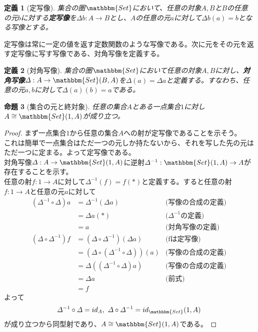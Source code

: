 \documentclass[uplatex,dvipdfmx]{jsarticle}
\newcommand{\cat}[1]{\mathbbm{#1}}
\newcommand{\arrow}{\rightarrow}
\newcommand{\mor}[3]{#1:#2\arrow #3}
\newcommand{\arset}[3]{\cat{#1}(#2,#3)}
\newtheorem{proof}{証明}[section]
\newtheorem{prop}[proof]{命題}
\newtheorem{define}[proof]{定義}
\numberwithin{proof}{subsection}
\begin{document}
  \begin{define}[定写像]
    集合の圏$\cat{Set}$において、任意の対象$A,B$と$B$の任意の元$b$に対する\textbf{定写像}を$\mor{\varDelta b}{A}{B}$とし、$A$の任意の元$a$に対して$\varDelta b(a)=b$となる写像とする。
  \end{define}
  定写像は常に一定の値を返す定数関数のような写像である。次に元をその元を返す定写像に写す写像である、対角写像を定義する。
  \begin{define}[対角写像]
    集合の圏$\cat{Set}$において任意の対象$A,B$に対し、\textbf{対角写像}$\mor{\varDelta}{A}{\arset{Set}{B}{A}}$を$\varDelta(a)=\varDelta a$と定義する。すなわち、任意の元$a,b$に対して$\varDelta(a)(b)=a$である。
  \end{define}
	\begin{prop}[集合の元と終対象]
		任意の集合$A$とある一点集合$1$に対し$A\cong\arset{Set}{1}{A}$が成り立つ。
	\end{prop}
	\begin{proof}
    まず一点集合$1$から任意の集合$A$への射が定写像であることを示そう。\\
    これは簡単で一点集合はただ一つの元しか持たないから、それを写した先の元はただ一つに定まる。よって定写像である。\\
    対角写像$\mor{\varDelta}{A}{\arset{Set}{1}{A}}$に逆射$\mor{\varDelta^{-1}}{\arset{Set}{1}{A}}{A}$が存在することを示す。\\
    任意の射$\mor{f}{1}{A}$に対して$\varDelta^{-1}(f)=f(*)$と定義する。すると任意の射$\mor{f}{1}{A}$と任意の元$a$に対して
    \begin{align*}
      (\varDelta^{-1}\circ\varDelta)a&=\varDelta^{-1}(\varDelta a)&\text{(写像の合成の定義)}\\
      &=\varDelta a(*)&\text{($\varDelta^{-1}$の定義)}\\
      &=a&\text{(対角写像の定義)}\\
      (\varDelta\circ\varDelta^{-1})f&=(\varDelta\circ\varDelta^{-1})(\varDelta a)&\text{(fは定写像)}\\
      &=(\varDelta\circ(\varDelta^{-1}\circ\varDelta))(a)&\text{(写像の合成の定義)}\\
      &=\varDelta((\varDelta^{-1}\circ\varDelta)a)&\text{(写像の合成の定義)}\\
      &=\varDelta a&\text{(前式)}\\
      &=f
    \end{align*}
    よって\[\varDelta^{-1}\circ\varDelta=id_A,\ \varDelta\circ\varDelta^{-1}=id_\arset{Set}{1}{A}\]が成り立つから同型射であり、$A\cong\arset{Set}{1}{A}$である。
	\end{proof}
\end{document}
